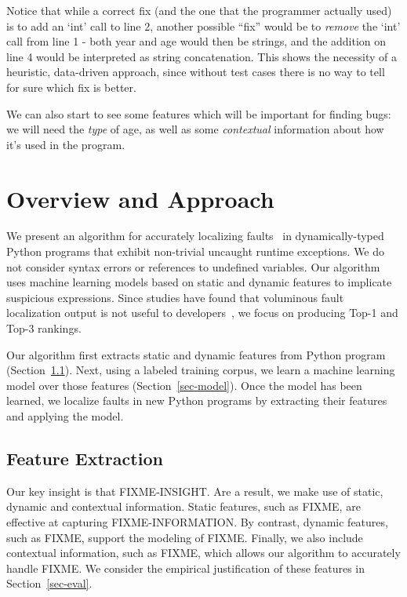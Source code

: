 \documentclass[conference]{IEEEtran}
\begin{document}
Notice that while a correct fix (and the one that the programmer
actually used) is to add an `int' call to line 2, another possible ``fix''
would be to \textit{remove} the `int' call from line 1 - both year and
age would then be strings, and the addition on line 4 would be interpreted
as string concatenation. This shows the necessity of a heuristic, data-driven
approach, since without test cases there is no way to tell for sure which
fix is better.

We can also start to see some features which will be
important for finding bugs: we will need the \textit{type} of age, as
well as some \textit{contextual} information about how it's used in the program.


\section{Overview and Approach}

We present an algorithm for accurately localizing faults~\cite{tarantula} in
dynamically-typed Python programs that exhibit non-trivial uncaught runtime
exceptions. We do not consider syntax errors or references to undefined
variables. Our algorithm uses machine learning models based on static and
dynamic features to implicate suspicious expressions. Since studies have
found that voluminous fault localization output is not useful to
developers~\cite{orso-parnin,orso-parnin2015}, we focus on producing
Top-1 and Top-3 rankings.

Our algorithm first extracts static and dynamic features from Python
program (Section~\ref{sec-features}). Next, using a labeled training
corpus, we learn a machine learning model over those features
(Section~\ref{sec-model}). Once the model has been learned, we localize
faults in new Python programs by extracting their features and applying the
model.

\subsection{Feature Extraction}
\label{sec-features}

Our key insight is that FIXME-INSIGHT. Are a result, we make use of
static, dynamic and contextual information. Static features, such as FIXME,
are effective at capturing FIXME-INFORMATION. By contrast, dynamic
features, such as FIXME, support the modeling of FIXME. Finally, we also
include contextual information, such as FIXME, which allows our algorithm
to accurately handle FIXME. We consider the empirical justification of
these features in Section~\ref{sec-eval}.
\end{document}

